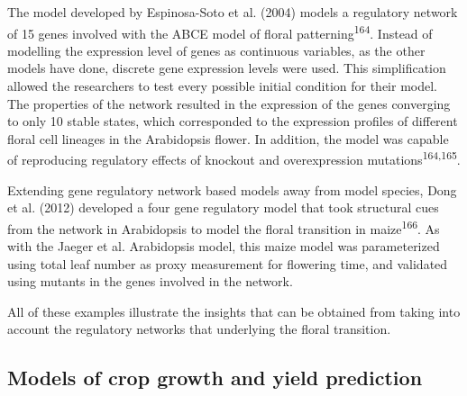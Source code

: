 \documentclass[12pt,]{book}
\begin{document}
The model developed by Espinosa-Soto et al. (2004) models a regulatory
network of 15 genes involved with the ABCE model of floral
patterning\textsuperscript{164}. Instead of modelling the expression
level of genes as continuous variables, as the other models have done,
discrete gene expression levels were used. This simplification allowed
the researchers to test every possible initial condition for their
model. The properties of the network resulted in the expression of the
genes converging to only 10 stable states, which corresponded to the
expression profiles of different floral cell lineages in the Arabidopsis
flower. In addition, the model was capable of reproducing regulatory
effects of knockout and overexpression
mutations\textsuperscript{164,165}.

Extending gene regulatory network based models away from model species,
Dong et al. (2012) developed a four gene regulatory model that took
structural cues from the network in Arabidopsis to model the floral
transition in maize\textsuperscript{166}. As with the Jaeger et al.
Arabidopsis model, this maize model was parameterized using total leaf
number as proxy measurement for flowering time, and validated using
mutants in the genes involved in the network.

All of these examples illustrate the insights that can be obtained from
taking into account the regulatory networks that underlying the floral
transition.

\subsection{Models of crop growth and yield
prediction}\label{models-of-crop-growth-and-yield-prediction}
\end{document}
